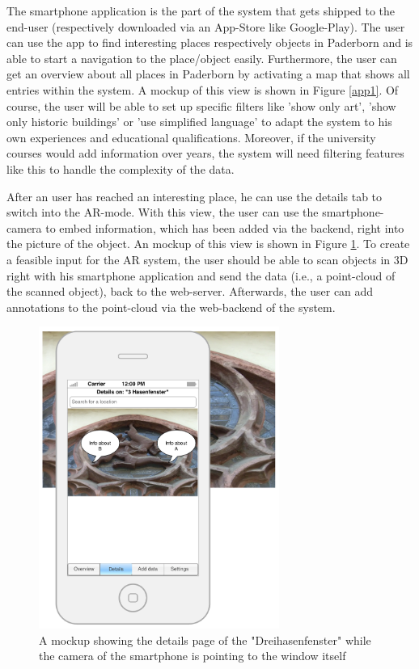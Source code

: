 \documentclass[a4page]{article}
\begin{document}
The smartphone application is the part of the system that gets shipped to the end-user (respectively downloaded via an App-Store like Google-Play). The user can use the app to find interesting places respectively objects in Paderborn and is able to start a navigation to the place/object easily. Furthermore, the user can get an overview about all places in Paderborn by activating a map that shows all entries within the system. A mockup of this view is shown in Figure \ref{app1}. Of course, the user will be able to set up specific filters like 'show only art', 'show only historic buildings' or 'use simplified language' to adapt the system to his own experiences and educational qualifications. Moreover, if the university courses would add information over years, the system will need filtering features like this to handle the complexity of the data.

After an user has reached an interesting place, he can use the details tab to switch into the \ac{AR}-mode. With this view, the user can use the smartphone-camera to embed information, which has been added via the backend, right into the picture of the object. An mockup of this view is shown in Figure \ref{app2}. 
To create a feasible input for the \ac{AR} system, the user should be able to scan objects in 3D right with his smartphone application and send the data (i.e., a point-cloud of the scanned object), back to the web-server.  Afterwards, the user can add annotations to the point-cloud via the web-backend of the system.  

\begin{figure}[th]
\centerline{\includegraphics[width=0.7\textwidth]{gfx/mockup_app_2}}
\caption{A mockup showing the details page of the "Dreihasenfenster" while the camera of the smartphone is pointing to the window itself}
\label{app2}
\end{figure}
\end{document}
